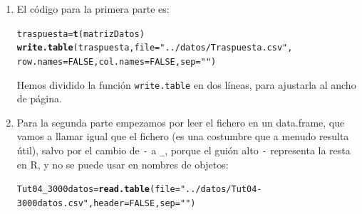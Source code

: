 \documentclass[10pt,a4paper]{article}\usepackage[]{graphicx}\usepackage[]{color}
\makeatletter
\newcommand{\hlnum}[1]{\textcolor[rgb]{0.686,0.059,0.569}{#1}}%
\newcommand{\hlstr}[1]{\textcolor[rgb]{0.192,0.494,0.8}{#1}}%
\newcommand{\hlstd}[1]{\textcolor[rgb]{0.345,0.345,0.345}{#1}}%
\newcommand{\hlkwb}[1]{\textcolor[rgb]{0.69,0.353,0.396}{#1}}%
\newcommand{\hlkwc}[1]{\textcolor[rgb]{0.333,0.667,0.333}{#1}}%
\newcommand{\hlkwd}[1]{\textcolor[rgb]{0.737,0.353,0.396}{\textbf{#1}}}%
\newenvironment{kframe}{%
 \def\at@end@of@kframe{}%
 \ifinner\ifhmode%
  \def\at@end@of@kframe{\end{minipage}}%
  \begin{minipage}{\columnwidth}%
 \fi\fi%
 \def\FrameCommand##1{\hskip\@totalleftmargin \hskip-\fboxsep
 \colorbox{shadecolor}{##1}\hskip-\fboxsep
     \hskip-\linewidth \hskip-\@totalleftmargin \hskip\columnwidth}%
 \MakeFramed {\advance\hsize-\width
   \@totalleftmargin\z@ \linewidth\hsize
   \@setminipage}}%
 {\par\unskip\endMakeFramed%
 \at@end@of@kframe}
\newenvironment{knitrout}{}{} %
\makeatother
\begin{document}
\begin{enumerate}
  \item El código para la primera parte es:
\begin{knitrout}
\color{fgcolor}\begin{kframe}
\begin{alltt}
\hlstd{traspuesta} \hlkwb{=} \hlkwd{t}\hlstd{(matrizDatos)}
\hlkwd{write.table}\hlstd{(traspuesta,} \hlkwc{file}\hlstd{=}\hlstr{"../datos/Traspuesta.csv"}\hlstd{,}
    \hlkwc{row.names} \hlstd{=} \hlnum{FALSE}\hlstd{,} \hlkwc{col.names}\hlstd{=}\hlnum{FALSE}\hlstd{,} \hlkwc{sep}\hlstd{=}\hlstr{" "}\hlstd{)}
\end{alltt}
\end{kframe}
\end{knitrout}
    Hemos dividido la función {\tt write.table} en dos líneas, para ajustarla al ancho de página.

  \item Para la segunda parte empezamos por leer el fichero en un data.frame, que vamos a llamar igual que el fichero (es una costumbre que a menudo resulta útil), salvo por el cambio de {\tt -} a {\tt \_}, porque el guión alto {\tt -} representa la resta en R, y no se puede usar en nombres de objetos:
\begin{knitrout}
\color{fgcolor}\begin{kframe}
\begin{alltt}
\hlstd{Tut04_3000datos} \hlkwb{=} \hlkwd{read.table}\hlstd{(}\hlkwc{file}\hlstd{=}\hlstr{"../datos/Tut04-3000datos.csv"}\hlstd{,} \hlkwc{header}\hlstd{=}\hlnum{FALSE}\hlstd{,} \hlkwc{sep}\hlstd{=}\hlstr{" "}\hlstd{)}
\end{alltt}
\end{kframe}
\end{knitrout}


\end{enumerate}
\end{document}
